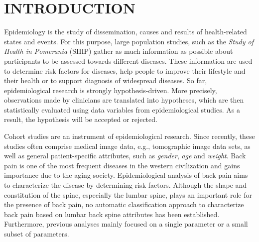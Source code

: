 \documentclass[a4paper,twoside]{style/article}
\begin{document}
\section{\uppercase{Introduction}}
\label{sec:Introduction}
Epidemiology is the study of dissemination, causes and results of health-related states and events.
For this purpose, large population studies, such as the \emph{Study of Health in Pomerania} (SHIP) \cite{SHIP} gather as much information as possible about participants to be assessed towards different diseases.
These information are used to determine risk factors for diseases, help people to improve their lifestyle and their health or to support diagnosis of widespread diseases.
So far, epidemiological research is strongly hypothesis-driven.
More precisely, observations made by clinicians are translated into hypotheses, which are then statistically evaluated using data variables from epidemiological studies.
As a result, the hypothesis will be accepted or rejected.

Cohort studies are an instrument of epidemiological research.
Since recently, these studies often comprise medical image data, e.g., tomographic image data sets, as well as general patient-specific attributes, such as \emph{gender}, \emph{age} and \emph{weight}.
Back pain is one of the most frequent diseases in the western civilization and gains importance due to the aging society.
Epidemiological analysis of back pain aims to characterize the disease by determining risk factors.
Although the shape and constitution of the spine, especially the lumbar spine, plays an important role for the presence of back pain, no automatic classification approach to characterize back pain based on lumbar back spine attributes has been established.
Furthermore, previous analyses mainly focused on a single parameter or a small subset of parameters.
\end{document}
